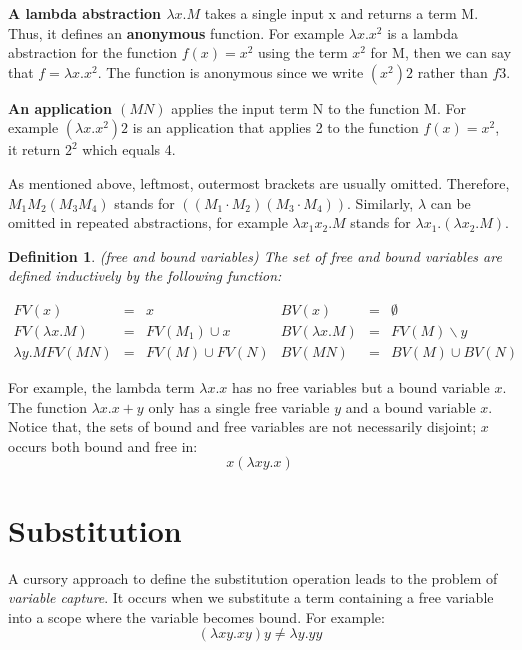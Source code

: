 \documentclass[a4paper,11pt,twoside]{report}
\newtheorem{def1}{\textbf{Definition}}[chapter]
\begin{document}
\textbf{A lambda abstraction $\lambda x.M$} takes a single input x and returns a term M. Thus, it defines an \textbf{anonymous} function. For example $\lambda x.x^2$ is a lambda abstraction for the function $f(x) = x^2$ using the term $x^2$ for M, then we can say that $f = \lambda x.x^2$. The function is anonymous since we write $(x^2)2$ rather than $f3$.

\textbf{An application $(MN)$} applies the input term N to the function M. For example $(\lambda x.x^2)2$ is an application that applies 2 to the function $f(x) = x^2$, it return $2^2$ which equals 4.

As mentioned above, leftmost, outermost brackets are usually omitted. Therefore, $M_1M_2(M_3M_4)$ stands for $((M_1\cdot M_2)(M_3\cdot M_4))$. Similarly, $\lambda$ can be omitted in repeated abstractions, for example $\lambda x_1x_2.M$ stands for $\lambda x_1.(\lambda x_2.M)$.

\begin{def1}
\normalfont (free and bound variables) The set of free and bound variables are defined inductively by the following function:
\end{def1}

\begin{equation*}
\begin{array}{lcllcl}
FV(x)           & = & {x}             & BV(x)           &=& \emptyset\\
FV(\lambda x.M) & = & FV(M_1)\cup {x} & BV(\lambda x.M) &=& FV(M)\backslash y\\  \lambda y.M
FV(MN)          & = & FV(M)\cup FV(N) & BV(MN)          &=& BV(M) \cup BV(N)
\end{array}
\end{equation*}


For example, the lambda term $\lambda x.x$ has no free variables but a bound variable $x$. The function $\lambda x.x+y$ only has a single free variable $y$ and a bound variable $x$. 
Notice that, the sets of bound and free variables are not necessarily disjoint; $x$ occurs both bound and free in:
\begin{equation*}
x(\lambda xy.x)
\end{equation*}


\section{Substitution}

\noindent A cursory approach to define the substitution operation leads to the problem of \textit{variable capture}. It occurs when we substitute a term containing a free variable into a scope where the variable becomes bound. For example:
\begin{equation*}
(\lambda xy.xy)y \neq \lambda y.yy
\end{equation*} 
\end{document}
